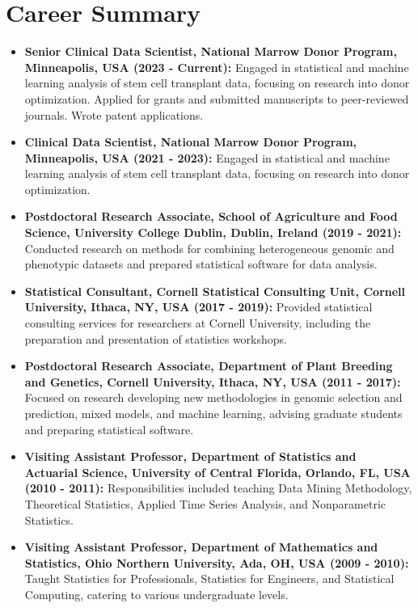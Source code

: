 \documentclass[11pt,a4paper,]{moderncv}
\providecommand{\tightlist}{%
	\setlength{\itemsep}{0pt}\setlength{\parskip}{0pt}}
\begin{document}
\section{Career Summary}\label{career-summary}

\begin{itemize}
\tightlist
\item
  \textbf{Senior Clinical Data Scientist, National Marrow Donor Program,
  Minneapolis, USA (2023 - Current):} Engaged in statistical and machine
  learning analysis of stem cell transplant data, focusing on research
  into donor optimization. Applied for grants and submitted manuscripts
  to peer-reviewed journals. Wrote patent applications.
\item
  \textbf{Clinical Data Scientist, National Marrow Donor Program,
  Minneapolis, USA (2021 - 2023):} Engaged in statistical and machine
  learning analysis of stem cell transplant data, focusing on research
  into donor optimization.
\item
  \textbf{Postdoctoral Research Associate, School of Agriculture and
  Food Science, University College Dublin, Dublin, Ireland (2019 -
  2021):} Conducted research on methods for combining heterogeneous
  genomic and phenotypic datasets and prepared statistical software for
  data analysis.
\item
  \textbf{Statistical Consultant, Cornell Statistical Consulting Unit,
  Cornell University, Ithaca, NY, USA (2017 - 2019):} Provided
  statistical consulting services for researchers at Cornell University,
  including the preparation and presentation of statistics workshops.
\item
  \textbf{Postdoctoral Research Associate, Department of Plant Breeding
  and Genetics, Cornell University, Ithaca, NY, USA (2011 - 2017):}
  Focused on research developing new methodologies in genomic selection
  and prediction, mixed models, and machine learning, advising graduate
  students and preparing statistical software.
\item
  \textbf{Visiting Assistant Professor, Department of Statistics and
  Actuarial Science, University of Central Florida, Orlando, FL, USA
  (2010 - 2011):} Responsibilities included teaching Data Mining
  Methodology, Theoretical Statistics, Applied Time Series Analysis, and
  Nonparametric Statistics.
\item
  \textbf{Visiting Assistant Professor, Department of Mathematics and
  Statistics, Ohio Northern University, Ada, OH, USA (2009 - 2010):}
  Taught Statistics for Professionals, Statistics for Engineers, and
  Statistical Computing, catering to various undergraduate levels.
\end{itemize}
\end{document}
